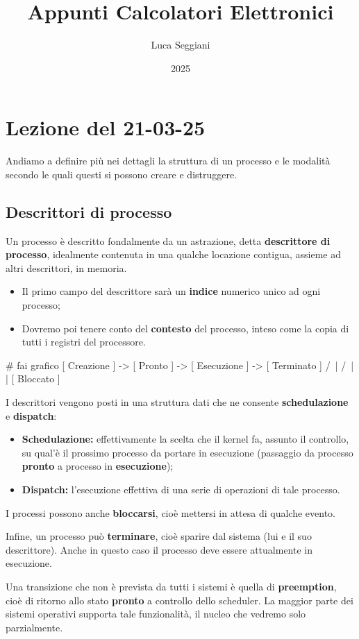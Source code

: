 \documentclass[a4paper,11pt]{article}
\title{Appunti Calcolatori Elettronici}
\author{Luca Seggiani}
\date{2025}
\begin{document}
\section{Lezione del 21-03-25}

\thispagestyle{empty}
\pagestyle{fancy}

Andiamo a definire più nei dettagli la struttura di un processo e le modalità secondo le quali questi si possono creare e distruggere.

\subsection{Descrittori di processo}
Un processo è descritto fondalmente da un astrazione, detta \textbf{descrittore di processo}, idealmente contenuta in una qualche locazione contigua, assieme ad altri descrittori, in memoria.
\begin{itemize}
	\item Il primo campo del descrittore sarà un \textbf{indice} numerico unico ad ogni processo;
	\item Dovremo poi tenere conto del \textbf{contesto} del processo, inteso come la copia di tutti i registri del processore. 
\end{itemize}

# fai grafico
[ Creazione ] -> [ Pronto ] -> [ Esecuzione ] -> [ Terminato ]
												/\		   | /\								
												|				\/ |
										  	[ Bloccato ]

I descrittori vengono posti in una struttura dati che ne consente \textbf{schedulazione} e \textbf{dispatch}:
\begin{itemize}
	\item \textbf{Schedulazione:} effettivamente la scelta che il kernel fa, assunto il controllo, su qual'è il prossimo processo da portare in esecuzione (passaggio da processo \textbf{pronto} a processo in \textbf{esecuzione});
	\item \textbf{Dispatch:} l'esecuzione effettiva di una serie di operazioni di tale processo. 
\end{itemize}

I processi possono anche \textbf{bloccarsi}, cioè mettersi in attesa di qualche evento. 

Infine, un processo può \textbf{terminare}, cioè sparire dal sistema (lui e il suo descrittore).
Anche in questo caso il processo deve essere attualmente in esecuzione.

Una transizione che non è prevista da tutti i sistemi è quella di \textbf{preemption}, cioè di ritorno allo stato \textbf{pronto} a controllo dello scheduler.
La maggior parte dei sistemi operativi supporta tale funzionalità, il nucleo che vedremo solo parzialmente.
\end{document}
